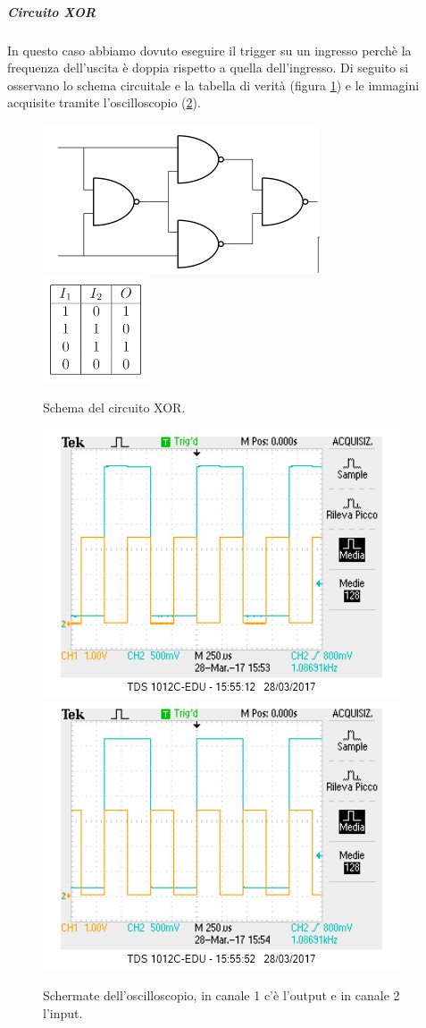 \documentclass[10pt,a4paper]{article}
\begin{document}
\subparagraph{Circuito XOR}
In questo caso abbiamo dovuto eseguire il trigger su un ingresso perchè la frequenza dell'uscita è doppia rispetto a quella dell'ingresso. Di seguito si osservano lo schema circuitale e la tabella di verità (figura \ref{fig:XOR}) e le immagini acquisite tramite l'oscilloscopio (\ref{osc:XOR}).


\begin{figure}[!htb]
  \centering
  \includegraphics[scale=0.7]{xor.png}\includegraphics[scale=0.9]{tabXOR.png}
\caption{Schema del circuito XOR.\label{fig:XOR}}
\end{figure}

\begin{figure}[!htb]
  \centering
  \includegraphics[scale=0.75]{xor1.png}\includegraphics[scale=0.75]{xor2.png}
\caption{Schermate dell'oscilloscopio, in canale 1 c'è l'output e in canale 2 l'input.\label{osc:XOR}}
\end{figure}
\end{document}
